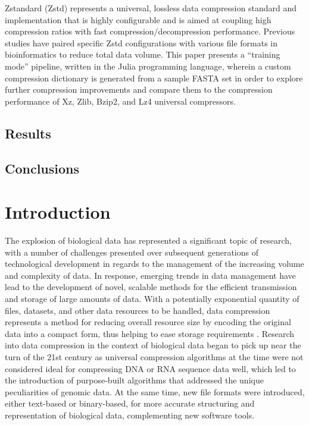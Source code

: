 \documentclass[
  10pt,
  letterpaper,
]{article}
\begin{document}
Zstandard (Zstd) represents a universal, lossless data compression
standard and implementation that is highly configurable and is aimed at
coupling high compression ratios with fast compression/decompression
performance. Previous studies have paired specific Zstd configurations
with various file formats in bioinformatics to reduce total data volume.
This paper presents a ``training mode'' pipeline, written in the Julia
programming language, wherein a custom compression dictionary is
generated from a sample FASTA set in order to explore further
compression improvements and compare them to the compression performance
of Xz, Zlib, Bzip2, and Lz4 universal compressors.

\hypertarget{results}{%
\subsection{Results}\label{results}}

\hypertarget{conclusions}{%
\subsection{Conclusions}\label{conclusions}}


\linenumbers\hypertarget{introduction}{%
\section{Introduction}\label{introduction}}

The explosion of biological data has represented a significant topic of
research, with a number of challenges presented over subsequent
generations of technological development in regards to the management of
the increasing volume and complexity of
data\citep{d2018high, li2014big}. In response, emerging trends in data
management have lead to the development of novel, scalable methods for
the efficient transmission and storage of large amounts of
data\citep{sais2022intelligent}. With a potentially exponential quantity
of files, datasets, and other data resources to be handled, data
compression represents a method for reducing overall resource size by
encoding the original data into a compact form, thus helping to ease
storage requirements \citep{jayasankar2021survey}. Research into data
compression in the context of biological data began to pick up near the
turn of the 21st century as universal compression algorithms at the time
were not considered ideal for compressing DNA or RNA sequence data well,
which led to the introduction of purpose-built algorithms that addressed
the unique peculiarities of genomic data\citep{grumbach1994new}. At the
same time, new file formats were introduced, either text-based or
binary-based, for more accurate structuring and representation of
biological data, complementing new software
tools\citep{lipman1985rapid, mills2014common}.
\end{document}
